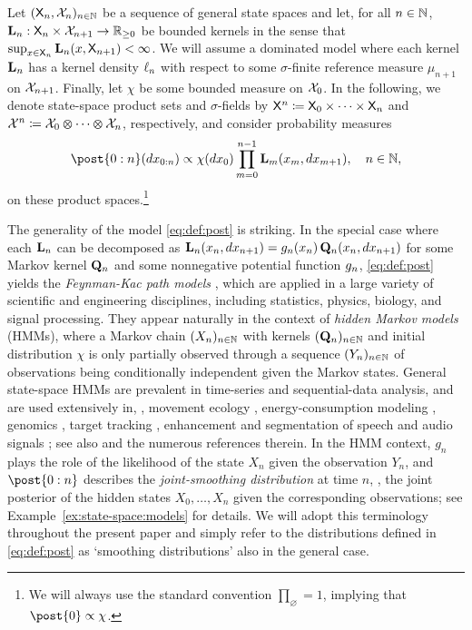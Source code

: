 Let $(\mathsf{X}_n, \mathcal{X}_n)_{n \in \mathbb{N}}$ be a sequence of general state spaces and let, for all $n \in \mathbb{N}$, $\mathbf{L}_{n} : \mathsf{X}_n \times \mathcal{X}_{n + 1} \to \mathbb{R}_{\geq 0}$ be bounded kernels in the sense that $\sup_{x \in \mathsf{X}_n} \mathbf{L}_{n}(x, \mathsf{X}_{n + 1}) < \infty$. We will assume a dominated model where each kernel $\mathbf{L}_{n}$ has a kernel density $\ell_{n}$ with respect to some $\sigma$-finite reference measure $\mu_{n + 1}$ on $\mathcal{X}_{n + 1}$. Finally, let $\chi$ be some bounded measure on $\mathcal{X}_0$. In the following, we denote state-space product sets and $\sigma$-fields by $\mathsf{X}^n \coloneqq \mathsf{X}_0 \times \cdots \times \mathsf{X}_n$ and $\mathcal{X}^n \coloneqq \mathcal{X}_0 \varotimes \cdots \varotimes \mathcal{X}_n$, respectively, and consider probability measures  
\begin{equation} \label{eq:def:post}
\post{0:n}(\rmd x_{0:n}) \propto \chi(\rmd x_0) \prod_{m = 0}^{n - 1} \uk{m}(x_m, \rmd x_{m + 1}), \quad n \in \nset, 
\end{equation}
on these product spaces.\footnote{We will always use the standard convention $\prod_{\varnothing} = 1$, implying that $\post{0} \propto \chi$.} 

The generality of the model \eqref{eq:def:post} is striking. In the special case where each $\mathbf{L}_{n}$ can be decomposed as $\mathbf{L}_{n}(x_n, d x_{n + 1}) = g_{n}(x_n) \, \mathbf{Q}_n(x_n, d x_{n + 1})$ for some Markov kernel $\mathbf{Q}_n$ and some nonnegative potential function $g_{n}$, \eqref{eq:def:post} yields the \emph{Feynman-Kac path models} \cite{delmoral:2004}, which are applied in a large variety of scientific and engineering disciplines, including statistics, physics, biology, and signal processing. 
They appear naturally in the context of \emph{hidden Markov models} (HMMs), where a Markov chain $(X_n)_{n \in \mathbb{N}}$ with kernels $(\mathbf{Q}_n)_{n \in \mathbb{N}}$ and initial distribution $\chi$ is only partially observed through a sequence $(Y_n)_{n \in \mathbb{N}}$ of observations being conditionally independent given the Markov states. General state-space HMMs are prevalent in time-series and sequential-data analysis, and are used extensively in, \eg, movement ecology \cite{michelot2016movehmm}, energy-consumption modeling \cite{candanedo2017methodology}, genomics \cite{yau2011bayesian}, target tracking \cite{sarkka2007rao}, enhancement and segmentation of speech and audio signals \cite{rabiner1989tutorial}; see also \cite{Cappe:2005:IHM:1088883,sarkka2013bayesian} and the numerous references therein. In the HMM context, $g_n$ plays the role of the likelihood of the state $X_n$ given the observation $Y_n$, and $\post{0:n}$ describes the \emph{joint-smoothing distribution} at time $n$, \ie, the joint posterior of the hidden states $X_0, \ldots, X_n$ given the corresponding observations; see Example~\ref{ex:state-space:models} for details. We will adopt this terminology throughout the present paper and simply refer to the distributions defined in \eqref{eq:def:post} as `smoothing distributions' also in the general case. 

